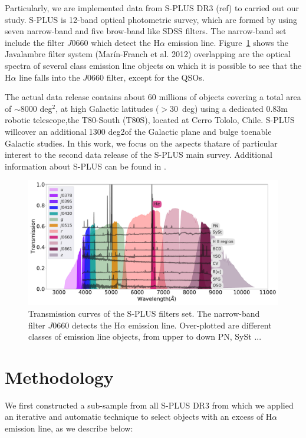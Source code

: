 \documentclass[fleqn,usenatbib]{mnras}
\begin{document}
Particularly, we are implemented data from S-PLUS DR3 (ref) to carried out our study. S-PLUS is 12-band optical photometric survey, which are formed by using seven narrow-band and five brow-band like SDSS filters. The narrow-band set include the filter $J$0660 which detect the H{$\alpha$} emission line. Figure~\ref{fig:curves} shows the Javalambre filter system (Marín-Franch et al. 2012) overlapping are the optical spectra of several class emission line objects on which it is possible to see that the H{$\alpha$} line falls into the $J$0660 filter, except for the QSOs.   

The actual data release contains about 60 millions of objects covering a total area of $\sim$8000 deg$^2$, at high Galactic latitudes ($ > 30$~deg) using a dedicated 0.83m robotic telescope,the T80-South (T80S), located at Cerro Tololo, Chile. S-PLUS willcover an additional1300 deg2of the Galactic plane and bulge toenable Galactic studies. In this work, we focus on the aspects thatare of particular interest to the second data release of the S-PLUS main survey. Additional information about S-PLUS can be found in \citet{Mendes:2019}. 

\begin{figure}
    \includegraphics[width=0.9\linewidth]{Figs/splus-filter.pdf}
    \caption{Transmission curves of the S-PLUS filters set. The narrow-band filter $J0660$ detects the H$\alpha$ emission line. Over-plotted are different classes of emission line objects, from upper to down PN, SySt ... }
    \label{fig:curves}
\end{figure}


\section{Methodology}
\label{sec:metho}

We first constructed a sub-sample from all S-PLUS DR3 from which we applied an iterative and automatic technique to select objects with an excess of H{$\alpha$} emission line,  as we describe below:
\end{document}
